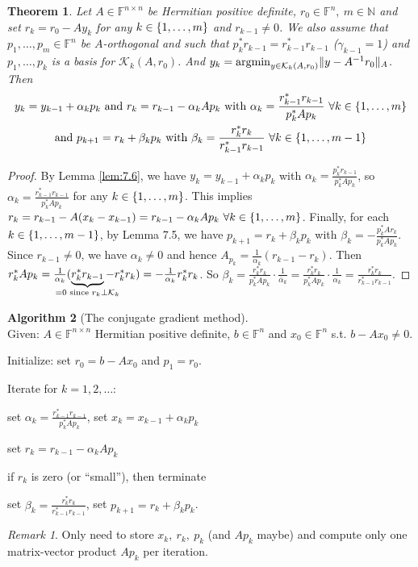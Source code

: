 \documentclass[12pt]{article}
\newcounter{lecture}
\newtheorem{theorem}{Theorem}[lecture]
\theoremstyle{definition}
\newtheorem{algorithm}[theorem]{Algorithm}
\theoremstyle{remark}
\newtheorem*{remark*}{Remark}
\numberwithin{equation}{section}
\newcommand{\F}{\mathbb{F}}
\newcommand{\N}{\mathbb{N}}
\newcommand{\K}{\mathcal{K}}
\DeclarePairedDelimiter{\norm}{\lVert}{\rVert}
\DeclarePairedDelimiter{\set}{\{}{\}}
\DeclareMathOperator{\argmin}{argmin}
\begin{document}
\begin{theorem}
  Let $A \in \F^{n\times n}$ be Hermitian positive definite, $r_0 \in \F^n,\ m \in \N$ and set $r_k = r_0 - A y_k$ for any $k \in \set{1,\ldots, m}$ and $r_{k-1} \neq 0$. We also assume that $p_1,\ldots, p_m \in  \F^n$ be $A$-orthogonal and such that $p_k^* r_{k-1} = r_{k-1}^* r_{k-1}$ ($\gamma_{k-1} = 1$) and $p_1, \ldots, p_k$ is a basis for $\K_k(A,r_0)$. And $y_k = \argmin_{y \in \K_k(A,r_0)} \norm{y - A^{-1} r_0}_A$. Then
  \begin{gather*}
    y_k = y_{k-1} + \alpha_k p_k \text{ and } r_k = r_{k-1} - \alpha_k A p_k \text{ with } \alpha_k = \frac{r_{k-1}^* r_{k-1}}{p_k^* A p_k}\ \forall k \in \set{1,\ldots,m}\\
    \text{and } p_{k+1} = r_k + \beta_k p_k \text{ with } \beta_k = \frac{r_k^* r_k}{r_{k-1}^* r_{k-1}}\ \forall k \in \set{1,\ldots,m-1}
  \end{gather*}
\end{theorem}
\begin{proof}
  By Lemma \ref{lem:7.6}, we have $y_k = y_{k-1} + \alpha_k p_k$ with $\alpha_k = \frac{p_k^* r_{k-1}}{p_k^* A p_k}$, so $\alpha_k = \frac{r_{k-1}^* r_{k-1}}{p_k^* A p_k}$ for any $k \in \set{1,\ldots,m}$. This implies $r_k = r_{k-1} - A (x_k - x_{k-1}) = r_{k-1} - \alpha_k A p_k \ \forall k \in \set{1,\ldots,m}$. Finally, for each $k \in \set{1,\ldots,m-1}$, by Lemma 7.5, we have $p_{k+1} = r_k + \beta_k p_k$ with $\beta_k = - \frac{p_k^* A r_k}{p_k^* A p_k}$. Since $r_{k-1} \neq 0$, we have $\alpha_k \neq 0$ and hence $A_{p_k} = \frac{1}{\alpha_k}(r_{k-1} - r_k)$. Then $r_k^* A p_k = \frac{1}{\alpha_k} (\underbrace{r_k^* r_{k-1}}_{\mathclap{=0\text{ since } r_k \perp \K_k}} - r_k^* r_k) = - \frac{1}{\alpha_k} r_k^* r_k$. So $\beta_k = \frac{r_k^* r_k}{p_k^* A p_k} \cdot \frac{1}{\overline{\alpha}_k} = \frac{r_k^*r_k}{p_k^*Ap_k} \cdot \frac{1}{\alpha_k} = \frac{r_k^* r_k}{r_{k-1}^* r_{ k-1 }}$.
\end{proof}

\begin{algorithm}[The conjugate gradient method]~\\
  \label{alg:7.8}
  Given: $A \in \F^{n\times n}$ Hermitian positive definite, $b \in \F^n$ and $x_0 \in \F^n$ s.t. $b-Ax_0 \neq 0$.

  \noindent Initialize: set $r_0 = b - Ax_0$ and $p_1 = r_0$.

  \noindent Iterate for $k = 1,2, \ldots$:

  set $\alpha_k = \frac{r_{k-1}^* r_{k-1}}{p_k^* A p_k}$, set $x_k = x_{k-1} + \alpha_k p_k$

  set $r_k = r_{k-1} - \alpha_k A p_k$

  if $r_k$ is zero (or ``small''), then terminate

  set $\beta_k = \frac{r_k^* r_k}{r_{k-1}^* r_{k-1}}$, set $p_{k+1} = r_k + \beta_k p_k$.
\end{algorithm}
\begin{remark*}
  Only need to store $x_k,\ r_k,\ p_k$ (and $A p_k$ maybe) and compute  only one matrix-vector product $A p_k$ per iteration.
\end{remark*}
\end{document}
